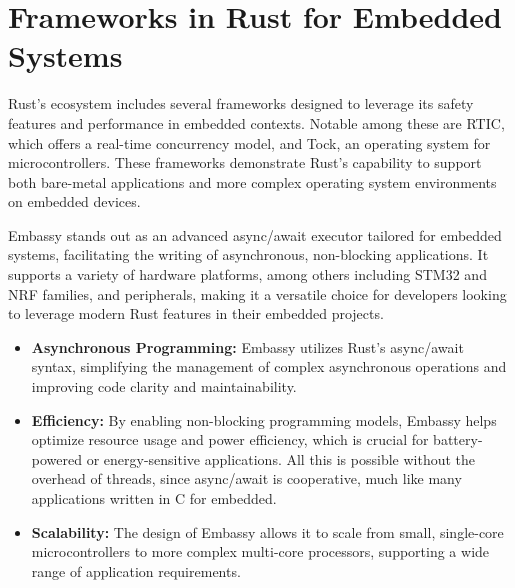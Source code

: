 \section{Frameworks in Rust for Embedded Systems}
Rust's ecosystem includes several frameworks designed to leverage its safety features and performance in embedded contexts. Notable among these are RTIC, which offers a real-time concurrency model, and Tock, an operating system for microcontrollers. These frameworks demonstrate Rust's capability to support both bare-metal applications and more complex operating system environments on embedded devices.

Embassy stands out as an advanced async/await executor tailored for embedded systems, facilitating the writing of asynchronous, non-blocking applications. It supports a variety of hardware platforms, among others including STM32 and NRF families, and peripherals, making it a versatile choice for developers looking to leverage modern Rust features in their embedded projects.

\begin{itemize}
    \item \textbf{Asynchronous Programming:} Embassy utilizes Rust's async/await syntax, simplifying the management of complex asynchronous operations and improving code clarity and maintainability.
    \item \textbf{Efficiency:} By enabling non-blocking programming models, Embassy helps optimize resource usage and power efficiency, which is crucial for battery-powered or energy-sensitive applications. All this is possible without the overhead of threads, since async/await is cooperative, much like many applications written in C for embedded.
    \item \textbf{Scalability:} The design of Embassy allows it to scale from small, single-core microcontrollers to more complex multi-core processors, supporting a wide range of application requirements.
\end{itemize}


